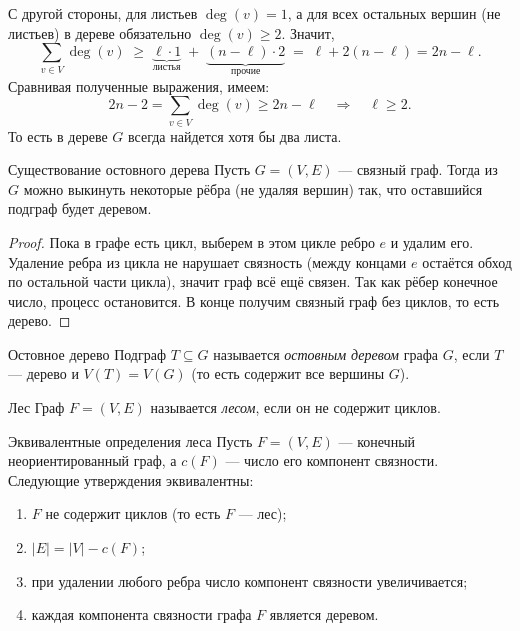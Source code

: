 	\medskip
	\noindent
	С другой стороны, для листьев $\deg(v)=1$, а для всех остальных вершин (не листьев)
	в дереве обязательно $\deg(v)\ge 2$. Значит,
	\[
	\sum_{v\in V}\deg(v)\;\ge\;\underbrace{\ell\cdot 1}_{\text{листья}}
	\;+\;\underbrace{(n-\ell)\cdot 2}_{\text{прочие}}
	\;=\;\ell+2(n-\ell)=2n-\ell.
	\]
	Сравнивая полученные выражения, имеем:
	\[
	2n-2 = \sum_{v\in V}\deg(v) \ge 2n-\ell \quad\Longrightarrow\quad \ell\ge 2.
	\]
	То есть в дереве $G$ всегда найдется хотя бы два листа.

\begin{Theorem}{Существование остовного дерева}{}
	Пусть $G=(V,E)$ — связный граф. Тогда из $G$ можно выкинуть некоторые рёбра
	(не удаляя вершин) так, что оставшийся подграф будет деревом.
\end{Theorem}

\begin{proof}
	Пока в графе есть цикл, выберем в этом цикле ребро $e$ и удалим его.
	Удаление ребра из цикла не нарушает связность (между концами $e$ остаётся обход по остальной части цикла),
	значит граф всё ещё связен. Так как рёбер конечное число, процесс остановится.
	В конце получим связный граф без циклов, то есть дерево.
\end{proof}

\begin{Definition}{Остовное дерево}{}
	Подграф $T\subseteq G$ называется \emph{остовным деревом} графа $G$,
	если $T$ — дерево и $V(T)=V(G)$ (то есть содержит все вершины $G$).
\end{Definition}

\begin{Definition}{Лес}{}
	Граф $F=(V,E)$ называется \emph{лесом}, если он не содержит циклов.
\end{Definition}

\begin{Statement}{Эквивалентные определения леса}{}
	Пусть $F=(V,E)$ — конечный неориентированный граф, а $c(F)$ — число его компонент связности.
	Следующие утверждения эквивалентны:
	\begin{enumerate}
		\item[(i)] $F$ не содержит циклов (то есть $F$ — лес);
		\item[(ii)] $|E| = |V| - c(F)$;
		\item[(iii)] при удалении любого ребра число компонент связности увеличивается;
		\item[(iv)] каждая компонента связности графа $F$ является деревом.
	\end{enumerate}
\end{Statement}

